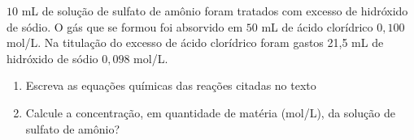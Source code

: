 $10$ mL de solução de sulfato de amônio foram tratados com excesso de hidróxido de sódio.
O gás que se formou foi absorvido em $50$ mL de ácido clorídrico $0,100$ mol/L.
Na titulação do excesso de ácido clorídrico foram gastos 21,5 mL de hidróxido de sódio $0,098$ mol/L.

\begin{enumerate}[label = (\scalealph{\alph*})]
	\item Escreva as equações químicas das reações citadas no texto
	\item Calcule a concentração, em quantidade de matéria (mol/L), da solução de sulfato de amônio?
\end{enumerate}
